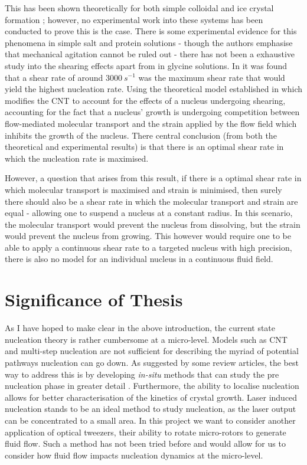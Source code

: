 This has been shown theoretically for both simple colloidal \cite{Mura2016,
Debuysschere2023,Richard2015} and ice crystal formation \cite{Goswami2020}; however, no experimental work into these systems has been conducted to prove 
this is the case. There is some experimental evidence for this phenomena in 
simple salt and protein solutions - though the authors emphasise that mechanical agitation cannot be ruled out - there has not been a exhaustive study into the shearing effects apart from in glycine solutions. In \cite{Debuysschere2023} it was found that a shear rate of around $3000\ s^{-1}$ was the maximum shear rate that would yield the highest nucleation rate. Using the theoretical model established in \cite{Mura2016,2001} which modifies the CNT to account for the effects of a nucleus undergoing shearing, 
accounting for the fact that a nucleus' growth is undergoing competition 
between flow-mediated molecular transport and the strain applied by the 
flow field which inhibits the growth of the nucleus. There central 
conclusion (from both the theoretical and experimental results) is that 
there is an optimal shear rate in which the nucleation rate is maximised. 

However, a question that arises from this result, if there is a optimal 
shear rate in which molecular transport is maximised and strain is 
minimised, then surely there should also be a shear rate in which the 
molecular transport and strain are equal - allowing one to suspend a 
nucleus at a constant radius. In this scenario, the molecular transport 
would prevent the nucleus from dissolving, but the strain would prevent 
the nucleus from growing. This however would require one to be able 
to apply a continuous shear rate to a targeted nucleus with high precision, there is also no model for an individual nucleus in a continuous fluid 
field. 


\section{Significance of Thesis}
As I have hoped to make clear in the above introduction, the current 
state nucleation theory is rather cumbersome at a micro-level. Models
such as CNT and multi-step nucleation are not sufficient for describing
the myriad of potential pathways nucleation can go down. As suggested
by some review articles, the best way to address this is by developing 
\textit{in-situ} methods that can study the pre nucleation phase in 
greater detail \cite{Fu2021}. Furthermore, the ability to localise 
nucleation allows for better characterisation of the kinetics of crystal 
growth. Laser induced nucleation stands to be an ideal method to study
nucleation, as the laser output can be concentrated to a small area. 
In this project we want to consider another application of optical 
tweezers, their ability to rotate micro-rotors to generate fluid flow.
Such a method has not been tried before and would allow for us to 
consider how fluid flow impacts nucleation dynamics at the micro-level. 

